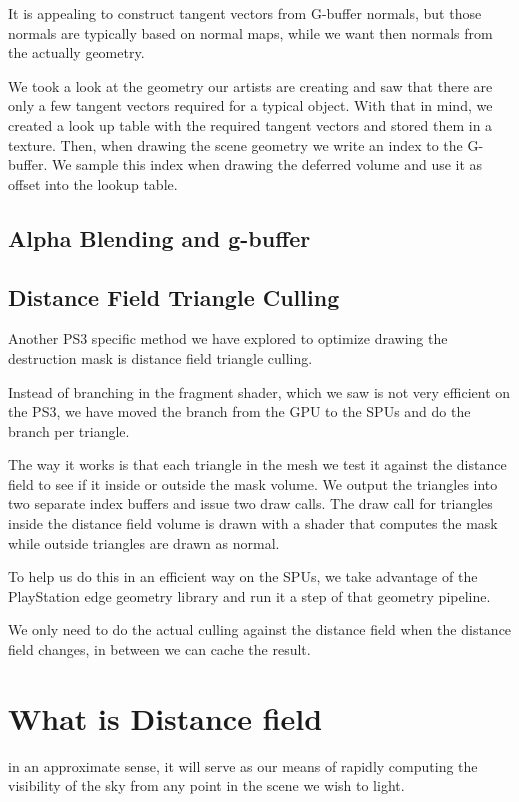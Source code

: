 It is appealing to construct tangent vectors from G-buffer normals, but those normals are typically based on normal maps, while we want then normals from the actually geometry.

We took a look at the geometry our artists are creating and saw that there are only a few tangent vectors required for a typical object. With that in mind, we created a look up table with the required tangent vectors and stored them in a texture. Then, when drawing the scene geometry we write an index to the G-buffer. We sample this index when drawing the deferred volume and use it as offset into the lookup table.

\subsection{Alpha Blending and g-buffer}
\subsection{Distance Field Triangle Culling}
Another PS3 specific method we have explored to optimize drawing the destruction mask is distance field triangle culling.

Instead of branching in the fragment shader, which we saw is not very efficient on the PS3, we have moved the branch from the GPU to the SPUs and do the branch per triangle.

The way it works is that each triangle in the mesh we test it against the distance field to see if it inside or outside the mask volume. We output the triangles into two separate index buffers and issue two draw calls. The draw call for triangles inside the distance field volume is drawn with a shader that computes the mask while outside triangles are drawn as normal.

To help us do this in an efficient way on the SPUs, we take advantage of the PlayStation edge geometry library and run it a step of that geometry pipeline.

We only need to do the actual culling against the distance field when the distance field changes, in between we can cache the result. 
















\section*{What is Distance field}
in an approximate sense, it will serve as our means of rapidly computing the visibility of the sky from any point in the scene we wish to light.

